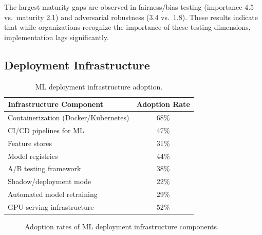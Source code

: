 \documentclass[
    language=english,
    doctype=survey-report,
    institution=none,
]{../../omnilatex}
\begin{document}
The largest maturity gaps are observed in fairness/bias testing (importance
4.5 vs.\ maturity 2.1) and adversarial robustness (3.4 vs.\ 1.8). These
results indicate that while organizations recognize the importance of these
testing dimensions, implementation lags significantly.

\subsection{Deployment Infrastructure}

\begin{table}[htbp]
    \centering
    \caption{ML deployment infrastructure adoption.}
    \label{tab:deployment}
    \begin{tabular}{@{}lc@{}}
        \toprule
        Infrastructure Component & Adoption Rate \\
        \midrule
        Containerization (Docker/Kubernetes) & 68\% \\
        CI/CD pipelines for ML & 47\% \\
        Feature stores & 31\% \\
        Model registries & 44\% \\
        A/B testing framework & 38\% \\
        Shadow/deployment mode & 22\% \\
        Automated model retraining & 29\% \\
        GPU serving infrastructure & 52\% \\
        \bottomrule
    \end{tabular}
\end{table}

\begin{figure}[htbp]
    \centering
    \caption{Adoption rates of ML deployment infrastructure components.}
    \label{fig:deployment-bar}
\end{figure}
\end{document}
